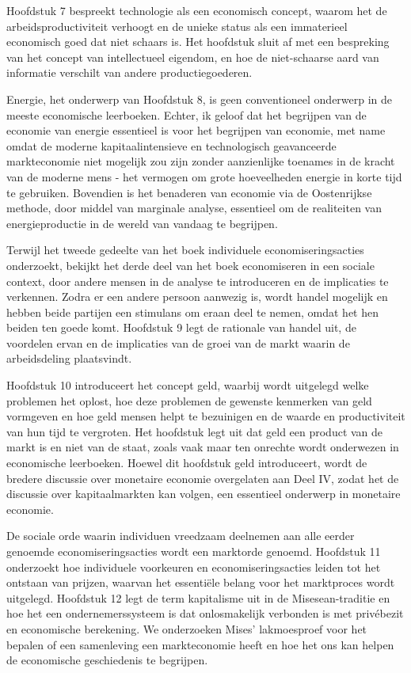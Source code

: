Hoofdstuk 7 bespreekt technologie als een economisch concept, waarom het de arbeidsproductiviteit verhoogt en de unieke status als een immaterieel economisch goed dat niet schaars is. Het hoofdstuk sluit af met een bespreking van het concept van intellectueel eigendom, en hoe de niet-schaarse aard van informatie verschilt van andere productiegoederen.

Energie, het onderwerp van Hoofdstuk 8, is geen conventioneel onderwerp in de meeste economische leerboeken. Echter, ik geloof dat het begrijpen van de economie van energie essentieel is voor het begrijpen van economie, met name omdat de moderne kapitaalintensieve en technologisch geavanceerde markteconomie niet mogelijk zou zijn zonder aanzienlijke toenames in de kracht van de moderne mens - het vermogen om grote hoeveelheden energie in korte tijd te gebruiken. Bovendien is het benaderen van economie via de Oostenrijkse methode, door middel van marginale analyse, essentieel om de realiteiten van energieproductie in de wereld van vandaag te begrijpen.

Terwijl het tweede gedeelte van het boek individuele economiseringsacties onderzoekt, bekijkt het derde deel van het boek economiseren in een sociale context, door andere mensen in de analyse te introduceren en de implicaties te verkennen. Zodra er een andere persoon aanwezig is, wordt handel mogelijk en hebben beide partijen een stimulans om eraan deel te nemen, omdat het hen beiden ten goede komt. Hoofdstuk 9 legt de rationale van handel uit, de voordelen ervan en de implicaties van de groei van de markt waarin de arbeidsdeling plaatsvindt.

Hoofdstuk 10 introduceert het concept geld, waarbij wordt uitgelegd welke problemen het oplost, hoe deze problemen de gewenste kenmerken van geld vormgeven en hoe geld mensen helpt te bezuinigen en de waarde en productiviteit van hun tijd te vergroten. Het hoofdstuk legt uit dat geld een product van de markt is en niet van de staat, zoals vaak maar ten onrechte wordt onderwezen in economische leerboeken. Hoewel dit hoofdstuk geld introduceert, wordt de bredere discussie over monetaire economie overgelaten aan Deel IV, zodat het de discussie over kapitaalmarkten kan volgen, een essentieel onderwerp in monetaire economie.

De sociale orde waarin individuen vreedzaam deelnemen aan alle eerder genoemde economiseringsacties wordt een marktorde genoemd. Hoofdstuk 11 onderzoekt hoe individuele voorkeuren en economiseringsacties leiden tot het ontstaan van prijzen, waarvan het essentiële belang voor het marktproces wordt uitgelegd. Hoofdstuk 12 legt de term kapitalisme uit in de Misesean-traditie en hoe het een ondernemerssysteem is dat onlosmakelijk verbonden is met privébezit en economische berekening. We onderzoeken Mises' lakmoesproef voor het bepalen of een samenleving een markteconomie heeft en hoe het ons kan helpen de economische geschiedenis te begrijpen.


